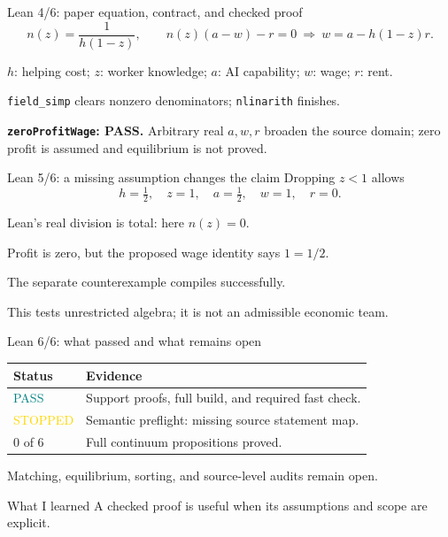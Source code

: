 \begin{frame}[fragile]{Lean 4/6: paper equation, contract, and checked proof}
\[n(z)=\frac1{h(1-z)},\qquad n(z)(a-w)-r=0
\ \Longrightarrow\ w=a-h(1-z)r.\]


\small
$h$: helping cost; $z$: worker knowledge; $a$: AI capability; $w$: wage; $r$: rent.\par
\texttt{field\_simp} clears nonzero denominators; \texttt{nlinarith} finishes.\par
\textbf{\texttt{zeroProfitWage}: PASS.} Arbitrary real $a,w,r$ broaden the source domain; zero profit is assumed and equilibrium is not proved.
\end{frame}

\begin{frame}{Lean 5/6: a missing assumption changes the claim}
Dropping $z<1$ allows
\[h=\tfrac12,\quad z=1,\quad a=\tfrac12,\quad w=1,\quad r=0.\]
\begin{points}
\item Lean's real division is total: here $n(z)=0$.
\item Profit is zero, but the proposed wage identity says $1=1/2$.
\item The separate counterexample compiles successfully.
\end{points}
\vspace{4mm}
This tests unrestricted algebra; it is not an admissible economic team.
\end{frame}

\begin{frame}{Lean 6/6: what passed and what remains open}
\begin{center}
\begin{tabular}{lp{8cm}}\toprule
Status & Evidence\\\midrule
\textcolor{teal}{PASS} & Support proofs, full build, and required fast check.\\
\textcolor{gold}{STOPPED} & Semantic preflight: missing source statement map.\\
0 of 6 & Full continuum propositions proved.\\\bottomrule
\end{tabular}
\end{center}
\vspace{4mm}
Matching, equilibrium, sorting, and source-level audits remain open.
\begin{block}{What I learned}
A checked proof is useful when its assumptions and scope are explicit.
\end{block}
\end{frame}

